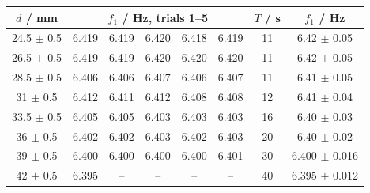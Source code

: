 \begin{tabular}{@{}cccccccc@{}}
\toprule
$d$ / mm & \multicolumn{5}{c}{$f_1$ / Hz, trials 1--5} & $T$ / s & $f_1$ / Hz \\
\midrule
24.5 $\pm$ 0.5 & 6.419 & 6.419 & 6.420 & 6.418 & 6.419 & 11 & 6.42 $\pm$ 0.05 \\
26.5 $\pm$ 0.5 & 6.419 & 6.419 & 6.420 & 6.420 & 6.420 & 11 & 6.42 $\pm$ 0.05 \\
28.5 $\pm$ 0.5 & 6.406 & 6.406 & 6.407 & 6.406 & 6.407 & 11 & 6.41 $\pm$ 0.05 \\
31 $\pm$ 0.5 & 6.412 & 6.411 & 6.412 & 6.408 & 6.408 & 12 & 6.41 $\pm$ 0.04 \\
33.5 $\pm$ 0.5 & 6.405 & 6.405 & 6.403 & 6.403 & 6.403 & 16 & 6.40 $\pm$ 0.03 \\
36 $\pm$ 0.5 & 6.402 & 6.402 & 6.403 & 6.402 & 6.403 & 20 & 6.40 $\pm$ 0.02 \\
39 $\pm$ 0.5 & 6.400 & 6.400 & 6.400 & 6.400 & 6.401 & 30 & 6.400 $\pm$ 0.016 \\
42 $\pm$ 0.5 & 6.395 & -- & -- & -- & -- & 40 & 6.395 $\pm$ 0.012 \\
\bottomrule
\end{tabular}